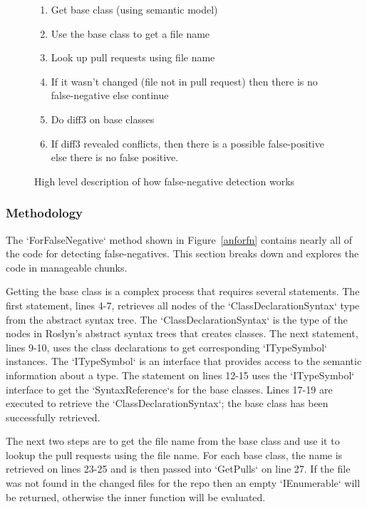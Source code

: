 \documentclass[draftclsnofoot,onecolumn]{IEEEtran}
\begin{document}
\begin{figure}[!htb]
\centering
\begin{enumerate}
    \item Get base class (using semantic model)
    \item Use the base class to get a file name
    \item Look up pull requests using file name
    \item If it wasn’t changed (file not in pull request) then there is no 
false-negative else continue
    \item Do diff3 on base classes
    \item If diff3 revealed conflicts, then there is a possible false-positive 
else there is no false positive.
\end{enumerate}
\caption{High level description of how false-negative detection works}
\label{fnalgore}
\end{figure}

\subsubsection{Methodology}
The `ForFalseNegative` method shown in Figure~\ref{anforfn} contains nearly all 
of the code for detecting false-negatives. This section breaks down and 
explores the code in manageable chunks.

Getting the base class is a complex process that requires several statements. 
The first statement, lines 4-7, retrieves all nodes of the  
`ClassDeclarationSyntax` type from the abstract syntax tree. The 
`ClassDeclarationSyntax` is the type of the nodes in Roslyn’s abstract syntax 
trees that creates classes. The next statement, lines 9-10, uses the class 
declarations to get corresponding `ITypeSymbol` instances. The `ITypeSymbol` is 
an interface that provides access to the semantic information about a type. The 
statement on lines 12-15 uses the `ITypeSymbol` interface to get the 
`SyntaxReference`s for the base classes. Lines 17-19 are executed to retrieve 
the `ClassDeclarationSyntax`; the base class has been successfully retrieved.

The next two steps are to get the file name from the base class and use it to 
lookup the pull requests using the file name. For each base class, the name is 
retrieved on lines 23-25 and is then passed into `GetPulls` on line 27. If the 
file was not found in the changed files for the repo then an empty 
`IEnumerable` will be returned, otherwise the inner function will be evaluated.
\end{document}
